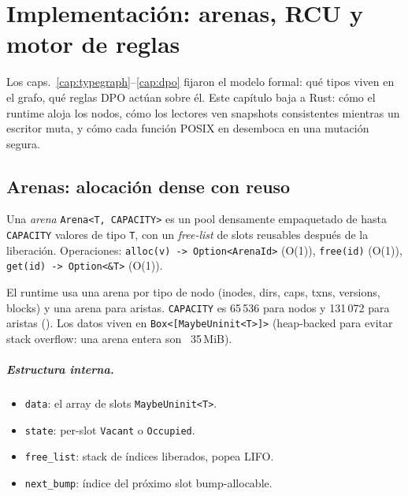 \chapter{Implementación: arenas, RCU y motor de reglas}
\label{cap:implementacion}

Los caps.~\ref{cap:typegraph}--\ref{cap:dpo} fijaron el modelo formal:
qué tipos viven en el grafo, qué reglas DPO actúan sobre él. Este
capítulo baja a Rust: cómo el runtime aloja los nodos, cómo los lectores
ven snapshots consistentes mientras un escritor muta, y cómo cada
función POSIX en  desemboca en una mutación segura.

\section{Arenas: alocación dense con reuso}

\begin{defn}
\label{def:arena}
Una \emph{arena} \texttt{Arena<T, CAPACITY>} es un pool densamente
empaquetado de hasta \texttt{CAPACITY} valores de tipo \texttt{T}, con
un \emph{free-list} de slots reusables después de la liberación.
Operaciones: \texttt{alloc(v) -> Option<ArenaId>} (O(1)),
\texttt{free(id)} (O(1)), \texttt{get(id) -> Option<\&T>} (O(1)).
\end{defn}

El runtime usa una arena por tipo de nodo (inodes, dirs, caps, txns,
versions, blocks) y una arena para aristas. \texttt{CAPACITY} es
65\,536 para nodos y 131\,072 para aristas
(). Los datos viven en
\texttt{Box<[MaybeUninit<T>]>} (heap-backed para evitar stack overflow:
una arena entera son ~35\,MiB).

\paragraph{Estructura interna.}

\begin{itemize}
  \item \texttt{data}: el array de slots \texttt{MaybeUninit<T>}.
  \item \texttt{state}: per-slot \texttt{Vacant} o \texttt{Occupied}.
  \item \texttt{free\_list}: stack de índices liberados, popea LIFO.
  \item \texttt{next\_bump}: índice del próximo slot bump-allocable.
\end{itemize}


